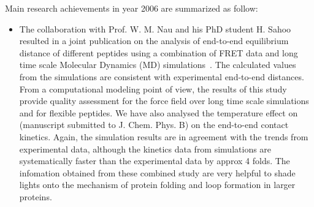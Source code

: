 Main research achievements in year 2006 are summarized as follow:

\begin{itemize}
\item{} The collaboration with Prof. W. M. Nau and his PhD student H. Sahoo resulted in a joint publication on the   
analysis of end-to-end equilibrium distance of different peptides using a combination of FRET data and long time scale Molecular Dynamics (MD) simulations~\cite{Sahoo06}. The calculated values from the simulations are 
consistent with experimental end-to-end distances. From a 
computational modeling point of view, the results of this study provide quality assessment for the force field over 
long time scale simulations and for flexible peptides.  
We have also analysed the temperature effect on (manuscript submitted to J. Chem. Phys. B) on
 the end-to-end contact kinetics. Again, the simulation results are in agreement with the trends from 
experimental data, although the kinetics data from simulations are systematically 
faster than the experimental data by approx 4 folds. The infomation obtained from these combined
study are very helpful to shade lights onto the mechanism of protein folding and loop formation
in larger proteins. 


\end{itemize}

